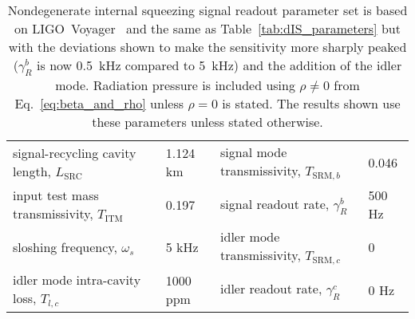\begin{table}
\centering
\begin{tabular}{@{}ll|ll@{}}
\toprule
signal-recycling cavity length, $L_\text{SRC}$ & 1.124 km & signal mode transmissivity, $T_{\text{SRM},b}$ & 0.046 \\
input test mass transmissivity, $T_\text{ITM}$ & 0.197 & signal readout rate, $\gamma^b_R$ & 500 Hz \\
sloshing frequency, $\omega_s$ & 5 kHz & idler mode transmissivity, $T_{\text{SRM},c}$ & 0 \\
idler mode intra-cavity loss, $T_{l,c}$ & 1000 ppm & idler readout rate, $\gamma^c_R$ & 0 Hz \\ \bottomrule
\end{tabular}
\caption{Nondegenerate internal squeezing signal readout parameter set is based on LIGO~Voyager~\cite{LIGO_Voyager} and the same as Table~\ref{tab:dIS_parameters} but with the deviations shown to make the sensitivity more sharply peaked ($\gamma^b_R$ is now 0.5~kHz compared to 5~kHz) and the addition of the idler mode. Radiation pressure is included using $\rho\neq0$ from Eq.~\ref{eq:beta_and_rho} unless $\rho=0$ is stated. The results shown use these parameters unless stated otherwise.}
\label{tab:signal_RO_parameters}
\end{table}

